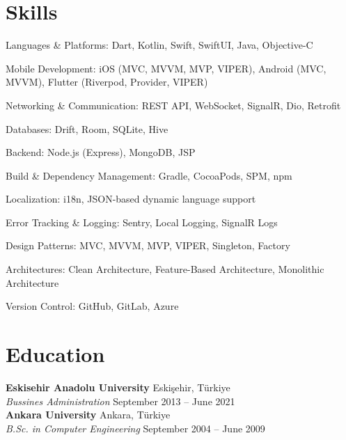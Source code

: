 \documentclass[10pt,a4paper]{extarticle}
\begin{document}
\section{Skills}
	\item Languages & Platforms: Dart, Kotlin, Swift, SwiftUI, Java, Objective-C
	\item Mobile Development: iOS (MVC, MVVM, MVP, VIPER), Android (MVC, MVVM), Flutter (Riverpod, Provider, VIPER)
	\item Networking & Communication: REST API, WebSocket, SignalR, Dio, Retrofit
	\item Databases: Drift, Room, SQLite, Hive
	\item Backend: Node.js (Express), MongoDB, JSP
	\item Build & Dependency Management: Gradle, CocoaPods, SPM, npm
	\item Localization: i18n, JSON-based dynamic language support
	\item Error Tracking & Logging: Sentry, Local Logging, SignalR Logs
	\item Design Patterns: MVC, MVVM, MVP, VIPER, Singleton, Factory
	\item Architectures: Clean Architecture, Feature-Based Architecture, Monolithic Architecture
	\item Version Control: GitHub, GitLab, Azure
\section{Education}
\textbf{Eskisehir Anadolu University} \hfill Eskişehir, Türkiye\\
\textit{Bussines Administration} \hfill September 2013 -- June 2021\\
\textbf{Ankara University} \hfill Ankara, Türkiye\\
\textit{B.Sc. in Computer Engineering} \hfill September 2004 -- June 2009\\
\end{document}

